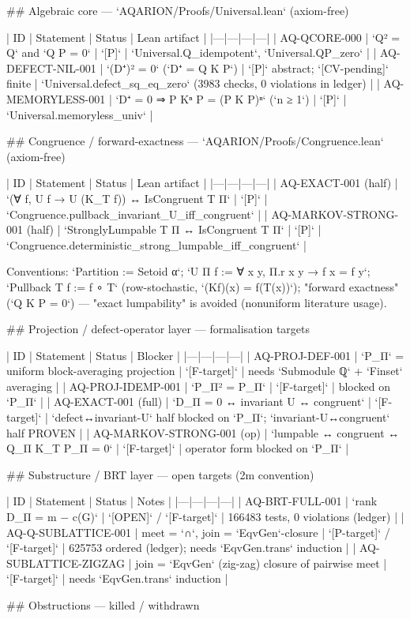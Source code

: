 ## Algebraic core — `AQARION/Proofs/Universal.lean` (axiom-free)

| ID | Statement | Status | Lean artifact |
|---|---|---|---|
| AQ-QCORE-000 | `Q² = Q` and `Q P = 0` | `[P]` | `Universal.Q_idempotent`, `Universal.QP_zero` |
| AQ-DEFECT-NIL-001 | `(D⁺)² = 0` (`D⁺ = Q K P`) | `[P]` abstract; `[CV-pending]` finite | `Universal.defect_sq_eq_zero` (3983 checks, 0 violations in ledger) |
| AQ-MEMORYLESS-001 | `D⁺ = 0 ⇒ P Kⁿ P = (P K P)ⁿ` (`n ≥ 1`) | `[P]` | `Universal.memoryless_univ` |

## Congruence / forward-exactness — `AQARION/Proofs/Congruence.lean` (axiom-free)

| ID | Statement | Status | Lean artifact |
|---|---|---|---|
| AQ-EXACT-001 (half) | `(∀ f, U f → U (K_T f)) ↔ IsCongruent T Π` | `[P]` | `Congruence.pullback_invariant_U_iff_congruent` |
| AQ-MARKOV-STRONG-001 (half) | `StronglyLumpable T Π ↔ IsCongruent T Π` | `[P]` | `Congruence.deterministic_strong_lumpable_iff_congruent` |

Conventions: `Partition := Setoid α`; `U Π f := ∀ x y, Π.r x y → f x = f y`;
`Pullback T f := f ∘ T` (row-stochastic, `(Kf)(x) = f(T(x))`);
"forward exactness" (`Q K P = 0`) — "exact lumpability" is avoided (nonuniform literature usage).

## Projection / defect-operator layer — formalisation targets

| ID | Statement | Status | Blocker |
|---|---|---|---|
| AQ-PROJ-DEF-001 | `P_Π` = uniform block-averaging projection | `[F-target]` | needs `Submodule ℚ` + `Finset` averaging |
| AQ-PROJ-IDEMP-001 | `P_Π² = P_Π` | `[F-target]` | blocked on `P_Π` |
| AQ-EXACT-001 (full) | `D_Π = 0 ↔ invariant U ↔ congruent` | `[F-target]` | `defect↔invariant-U` half blocked on `P_Π`; `invariant-U↔congruent` half PROVEN |
| AQ-MARKOV-STRONG-001 (op) | `lumpable ↔ congruent ↔ Q_Π K_T P_Π = 0` | `[F-target]` | operator form blocked on `P_Π` |

## Substructure / BRT layer — open targets (2m convention)

| ID | Statement | Status | Notes |
|---|---|---|---|
| AQ-BRT-FULL-001 | `rank D_Π = m − c(G)` | `[OPEN]` / `[F-target]` | 166483 tests, 0 violations (ledger) |
| AQ-Q-SUBLATTICE-001 | meet = `∩`, join = `EqvGen`-closure | `[P-target]` / `[F-target]` | 625753 ordered (ledger); needs `EqvGen.trans` induction |
| AQ-SUBLATTICE-ZIGZAG | join = `EqvGen` (zig-zag) closure of pairwise meet | `[F-target]` | needs `EqvGen.trans` induction |

## Obstructions — killed / withdrawn

